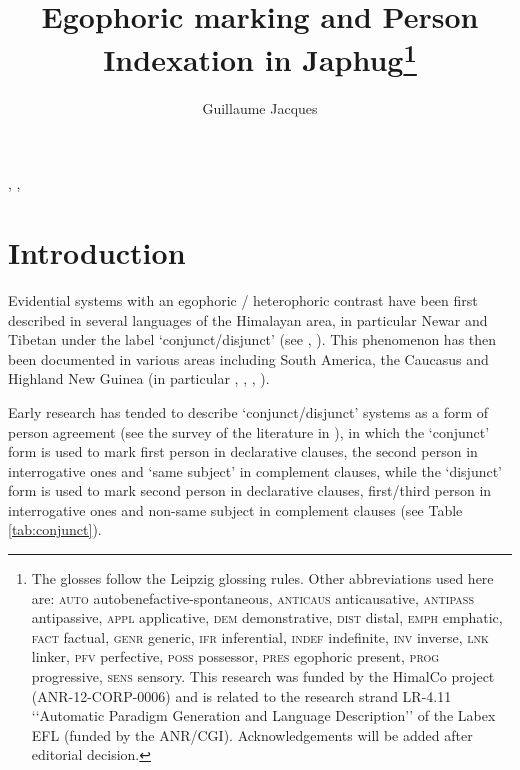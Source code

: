 \documentclass[oldfontcommands,oneside,a4paper,11pt]{article}
\begin{document}
 
\title{Egophoric marking and Person Indexation in Japhug\footnote{ The glosses follow the Leipzig glossing rules. Other abbreviations used here are: \textsc{auto}  autobenefactive-spontaneous, \textsc{anticaus} anticausative, \textsc{antipass} antipassive, \textsc{appl} applicative, \textsc{dem} demonstrative,  \textsc{dist} distal, \textsc{emph} emphatic, \textsc{fact} factual, \textsc{genr} generic, \textsc{ifr} inferential, \textsc{indef} indefinite, \textsc{inv} inverse,  \textsc{lnk} linker, \textsc{pfv} perfective, \textsc{poss} possessor, \textsc{pres} egophoric present, \textsc{prog} progressive, \textsc{sens} sensory. This research was funded by the HimalCo project (ANR-12-CORP-0006) and is related to the research strand LR-4.11 ‘‘Automatic Paradigm Generation and Language Description’’ of the Labex EFL (funded by the ANR/CGI). Acknowledgements   will be added after editorial decision. %
} }
\author{Guillaume Jacques}
\maketitle

\citet{bendix74newari}, \citet{yukawa71rinkaku}, 
\sloppy
\section*{Introduction}
Evidential systems with an egophoric / heterophoric contrast have been first described in several languages of the Himalayan area, in particular Newar and Tibetan under the label `conjunct/disjunct' (see \citealt{hale80conjunct}, \citealt{delancey92conjunct}). This phenomenon has then been documented in various areas including South America, the Caucasus and Highland New Guinea (in particular \citealt{creissels08akhvakh}, \citealt{curnow02conjunct}, \citealt{sanroque12evidentiality}, \citealt{sanroque17interrogativity}). 

Early research has tended to describe `conjunct/disjunct' systems as a form of person agreement (see the survey of the literature in \citealt{hill17evidential}), in which the `conjunct' form is used to mark first person in declarative clauses, the second person in interrogative ones and `same subject' in complement clauses, while the `disjunct' form is used to mark second person in declarative clauses, first/third person in interrogative ones and non-same subject in complement clauses (see Table \ref{tab:conjunct}).
\end{document}
